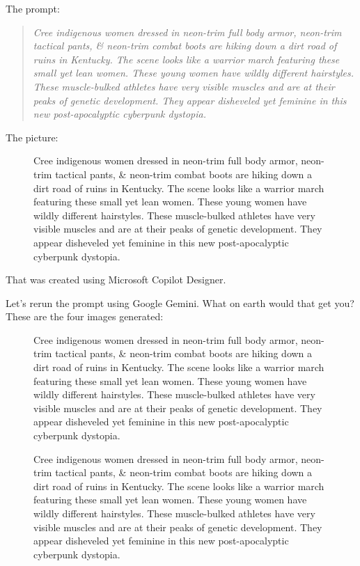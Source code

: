The prompt:

\begin{quote}
\emph{Cree indigenous women dressed in neon-trim full body armor,
neon-trim tactical pants, \& neon-trim combat boots are hiking down a
dirt road of ruins in Kentucky. The scene looks like a warrior march
featuring these small yet lean women. These young women have wildly
different hairstyles. These muscle-bulked athletes have very visible
muscles and are at their peaks of genetic development. They appear
disheveled yet feminine in this new post-apocalyptic cyberpunk
dystopia.}
\end{quote}

The picture:

\begin{figure}
\centering
{}
\caption{Cree indigenous women dressed in neon-trim full body armor,
neon-trim tactical pants, \& neon-trim combat boots are hiking down a
dirt road of ruins in Kentucky. The scene looks like a warrior march
featuring these small yet lean women. These young women have wildly
different hairstyles. These muscle-bulked athletes have very visible
muscles and are at their peaks of genetic development. They appear
disheveled yet feminine in this new post-apocalyptic cyberpunk
dystopia.}
\end{figure}

That was created using Microsoft Copilot Designer.

Let's rerun the prompt using Google Gemini. What on earth would that get
you? These are the four images generated:

\begin{figure}
\centering
{}
\caption{Cree indigenous women dressed in neon-trim full body armor,
neon-trim tactical pants, \& neon-trim combat boots are hiking down a
dirt road of ruins in Kentucky. The scene looks like a warrior march
featuring these small yet lean women. These young women have wildly
different hairstyles. These muscle-bulked athletes have very visible
muscles and are at their peaks of genetic development. They appear
disheveled yet feminine in this new post-apocalyptic cyberpunk
dystopia.}
\end{figure}

\begin{figure}
\centering
{}
\caption{Cree indigenous women dressed in neon-trim full body armor,
neon-trim tactical pants, \& neon-trim combat boots are hiking down a
dirt road of ruins in Kentucky. The scene looks like a warrior march
featuring these small yet lean women. These young women have wildly
different hairstyles. These muscle-bulked athletes have very visible
muscles and are at their peaks of genetic development. They appear
disheveled yet feminine in this new post-apocalyptic cyberpunk
dystopia.}
\end{figure}

